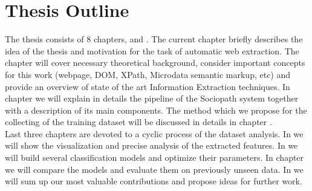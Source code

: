 \section{Thesis Outline}
The thesis consists of 8 chapters,  and . 
The current chapter briefly describes the idea of the thesis and motivation for the task of automatic web extraction. The chapter  will cover necessary theoretical background, consider important concepts for this work (webpage, DOM, XPath, Microdata semantic markup, etc) and provide an overview of state of the art Information Extraction techniques. In chapter  we will explain in details the pipeline of the Sociopath system together with a description of its main components. The method which we propose for the collecting of the training dataset will be discussed in details in chapter . \\

Last three chapters are devoted to a cyclic process of the dataset analysis. In  we will show the visualization and precise analysis of the extracted features. In  we will build several classification models and optimize their parameters. In chapter  we will compare the models and evaluate them on previously unseen data. In  we will sum up our most valuable contributions and propose ideas for further work.
